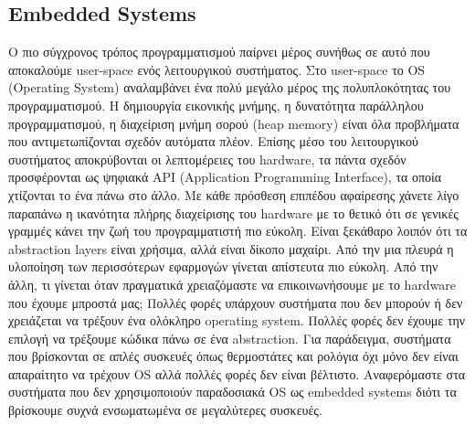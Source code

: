 \subsection{Embedded Systems}

Ο πιο σύγχρονος τρόπος προγραμματισμού παίρνει μέρος συνήθως σε αυτό
που αποκαλούμε user-space ενός λειτουργικού συστήματος.  Στο
user-space το OS (Operating System) αναλαμβάνει ένα πολύ μεγάλο μέρος
της πολυπλοκότητας του προγραμματισμού. Η δημιουργία εικονικής μνήμης,
η δυνατότητα παράλληλου προγραμματισμού, η διαχείριση μνήμη σορού
(heap memory) είναι όλα προβλήματα που αντιμετωπίζονται σχεδόν
αυτόματα πλέον. Επίσης μέσο του λειτουργικού συστήματος αποκρύβονται
οι λεπτομέρειες του hardware, τα πάντα σχεδόν προσφέρονται ως ψηφιακά
API (Application Programming Interface), τα οποία χτίζονται το ένα
πάνω στο άλλο.  Με κάθε πρόσθεση επιπέδου αφαίρεσης χάνετε λίγο
παραπάνω η ικανότητα πλήρης διαχείρισης του hardware με το θετικό ότι
σε γενικές γραμμές κάνει την ζωή του προγραμματιστή πιο εύκολη. Είναι
ξεκάθαρο λοιπόν ότι τα abstraction layers είναι χρήσιμα, αλλά είναι
δίκοπο μαχαίρι. Από την μια πλευρά η υλοποίηση των περισσότερων
εφαρμογών γίνεται απίστευτα πιο εύκολη. Από την άλλη, τι γίνεται όταν
πραγματικά χρειαζόμαστε να επικοινωνήσουμε με το hardware που έχουμε
μπροστά μας;
Πολλές φορές υπάρχουν συστήματα που δεν μπορούν ή δεν χρειάζεται
να τρέξουν ένα ολόκληρο operating system. Πολλές φορές δεν έχουμε την
επιλογή να τρέξουμε κώδικα πάνω σε ένα abstraction. Για παράδειγμα,
συστήματα που βρίσκονται σε απλές συσκευές όπως θερμοστάτες και
ρολόγια όχι μόνο δεν είναι απαραίτητο να τρέχουν OS αλλά πολλές φορές
δεν είναι βέλτιστο. 
Αναφερόμαστε στα συστήματα που δεν χρησιμοποιούν παραδοσιακά OS  ως
embedded systems διότι τα βρίσκουμε συχνά ενσωματωμένα σε μεγαλύτερες συσκευές.

